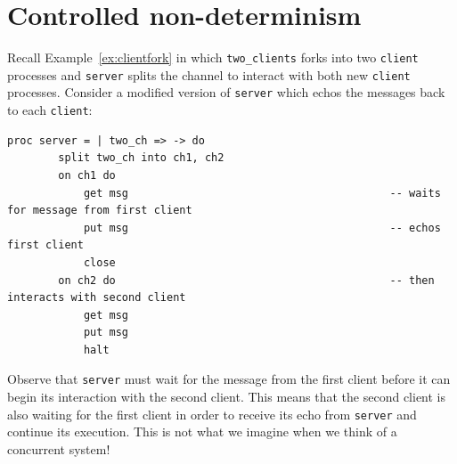 \documentclass[11pt]{article}
\begin{document}
\section{Controlled non-determinism}
Recall Example~\ref{ex:clientfork} in which \lstinline$two_clients$ forks into two \lstinline$client$ processes and \lstinline$server$ splits the channel to interact with both new \lstinline$client$ processes.
Consider a modified version of \lstinline$server$ which echos the messages back to each \lstinline$client$:
\begin{lstlisting}
proc server = | two_ch => -> do
		split two_ch into ch1, ch2		
		on ch1 do											
			get msg											-- waits for message from first client
			put msg											-- echos first client
			close
		on ch2 do											-- then interacts with second client
			get msg						
			put msg						
			halt			
\end{lstlisting}
Observe that \lstinline$server$ must wait for the message from the first client before it can begin its interaction with the second client.
This means that the second client is also waiting for the first client in order to receive its echo from \lstinline$server$ and continue its execution.
This is not what we imagine when we think of a concurrent system!
\end{document}
